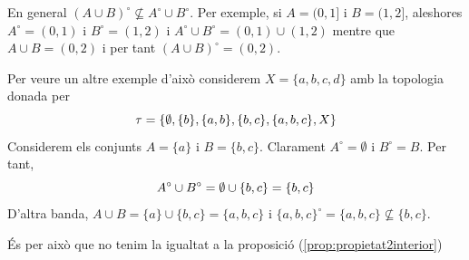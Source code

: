 \documentclass[../main.tex]{subfiles}
\begin{document}
\begin{nota}
\label{nota:propietat2interior} En general $(A\cup B)^\circ\not\subseteq A^\circ\cup B^\circ$. Per exemple, si $A=(0,1]$ i $B=(1,2]$, aleshores $A^\circ = (0,1)$ i $B^\circ=(1,2)$ i $A^\circ\cup B^\circ = (0,1)\cup(1,2)$ mentre que $A\cup B=(0,2)$ i per tant $(A\cup B)^\circ = (0,2)$.
\end{nota}

Per veure un altre exemple d'això considerem $X = \{a,b,c,d\}$ amb la topologia donada per
\begin{equation}
    \notag
    \tau = \{\emptyset,\{b\},\{a,b\},\{b,c\},\{a,b,c\},X\}
\end{equation}
Considerem els conjunts $A = \{a\}$ i $B = \{b,c\}$. Clarament $A^\circ = \emptyset$ i $B^\circ = B$. Per tant, 
\begin{equation}
    \notag
    A^\circ\cup B^\circ = \emptyset\cup\{b,c\} = \{b,c\}
\end{equation}
D'altra banda, $A\cup B = \{a\}\cup\{b,c\} = \{a,b,c\}$ i $\{a,b,c\}^\circ = \{a,b,c\}\not\subseteq\{b,c\}$.

És per això que no tenim la igualtat a la proposició (\ref{prop:propietat2interior})
\end{document}
